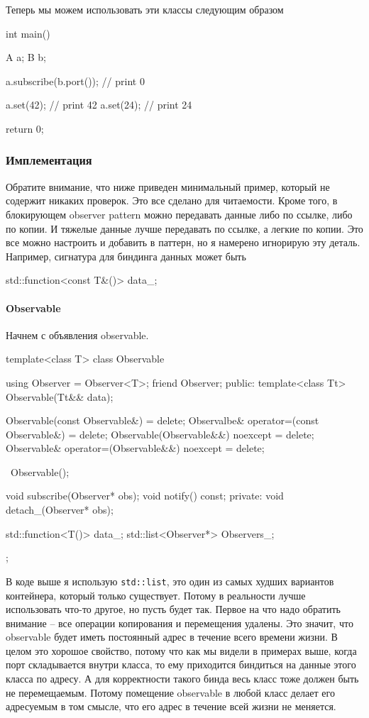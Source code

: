 Теперь мы можем использовать эти классы следующим образом
\begin{cppcode}
int main() {
  A a;
  B b;
  
  a.subscribe(b.port());  // print 0
  
  a.set(42);              // print 42
  a.set(24);              // print 24
    
  return 0;
}
\end{cppcode}

\subsubsection{Имплементация}

Обратите внимание, что ниже приведен минимальный пример, который не содержит никаких проверок.
Это все сделано для читаемости.
Кроме того, в блокирующем observer pattern можно передавать данные либо по ссылке, либо по копии.
И тяжелые данные лучше передавать по ссылке, а легкие по копии.
Это все можно настроить и добавить в паттерн, но я намерено игнорирую эту деталь.
Например, сигнатура для биндинга данных может быть 
\begin{cppcode}
std::function<const T&()> data_;
\end{cppcode}

\paragraph{Observable}

Начнем с объявления observable.
\begin{cppcode}
template<class T>
class Observable {
  using Observer = Observer<T>;
  friend Observer;
public:
  template<class Tt>
  Observable(Tt&& data);
  
  Observable(const Observable&) = delete;
  Observalbe& operator=(const Observable&) = delete;
  Observable(Observable&&) noexcept = delete;
  Observable& operator=(Observable&&) noexcept = delete;
  
  ~Observable();
  
  void subscribe(Observer* obs);
  void notify() const;
private:
  void detach_(Observer* obs);
  
  std::function<T()> data_;
  std::list<Observer*> Observers_;
};
\end{cppcode}
В коде выше я использую \verb"std::list", это один из самых худших вариантов контейнера, который только существует.
Потому в реальности лучше использовать что-то другое, но пусть будет так.
Первое на что надо обратить внимание -- все операции копирования и перемещения удалены.
Это значит, что observable будет иметь постоянный адрес в течение всего времени жизни.
В целом это хорошое свойство, потому что как мы видели в примерах выше, когда порт складывается внутри класса, то ему приходится биндиться на данные этого класса по адресу.
А для корректности такого бинда весь класс тоже должен быть не перемещаемым.
Потому помещение observable в любой класс делает его адресуемым в том смысле, что его адрес в течение всей жизни не меняется.

